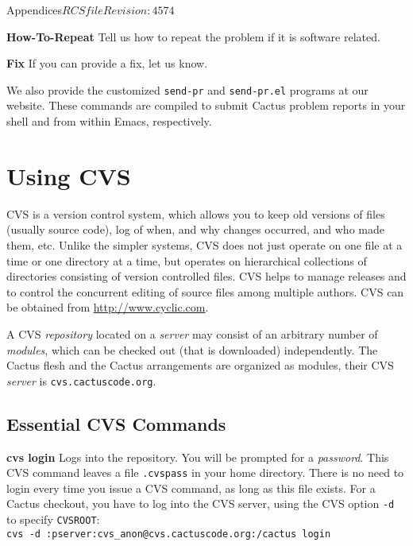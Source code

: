 \begin{cactuspart}{Appendices}{$RCSfile$}{$Revision: 4574 $}
\begin{Lentry}
\item[{\bf How-To-Repeat}] Tell us how to repeat the problem if it is
software related.

\item[{\bf Fix}] If you can provide a fix, let us know.
\end{Lentry}

We also provide the customized {\tt send-pr} and {\tt send-pr.el} programs at
our website. These commands are compiled to submit Cactus problem
reports in your shell and from within Emacs, respectively.




\chapter{Using CVS}
\label{sec:Appendix.cvs}
CVS is a version control system, which allows you to  keep
old versions of files (usually source code), log of
when, and why changes occurred, and who made them,  etc.
Unlike the simpler systems, CVS does not just operate on one file at a
time or one directory at a time,  but
operates  on  hierarchical collections of directories consisting of
version controlled files.  CVS helps to  manage
releases  and  to control the concurrent editing of source
files among multiple  authors. CVS can be obtained from
\url{http://www.cyclic.com}.

A CVS \textit{repository} located on a \textit{server} may consist of an arbitrary
number of \textit{modules}, which can be checked out (that is downloaded)
independently. The Cactus flesh and the Cactus
arrangements are organized as modules, their CVS \textit{server} is {\tt cvs.cactuscode.org}.

\section{Essential CVS Commands}

\begin{Lentry}
\item[{\bf cvs login}]
Logs into the repository. You will be prompted for a \textit{password}.
This CVS command leaves a file {\tt .cvspass} in your
home directory. There is no need to login every time you issue a CVS
command, as long as this file exists. For a Cactus checkout, you have
to log into the CVS server, using the CVS option {\tt -d} to specify {\tt CVSROOT}:\\
{\tt cvs -d :pserver:cvs\_anon@cvs.cactuscode.org:/cactus login}


\end{Lentry}
\end{cactuspart}
